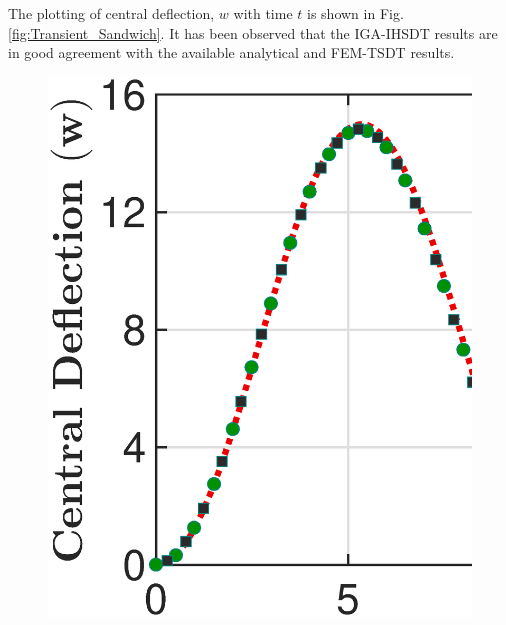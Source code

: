 \documentclass[3p,preprint,12pt]{elsarticle}
\begin{document}
The plotting of central deflection, $w$ with time $t$ is shown in Fig. \ref{fig:Transient_Sandwich}. It has been observed that the IGA-IHSDT results are in good agreement with the available analytical \cite{roque2011transient}  and FEM-TSDT \cite{roque2011transient} results.

\begin{figure}
	\centering
	\begin{minipage}{\textwidth}
		\graphicspath{{./All_Images./}}
		\centering
		{\includegraphics[scale=0.3]{Step_SSL_Sandwich_IGA_NPSDT_Transient_h_By_a_1_10.eps}}
	\end{minipage}\vspace{0.5cm}
	\begin{minipage}{\textwidth}
		\graphicspath{{./All_Images./}}
		\centering

\end{minipage}
\end{figure}
\end{document}
